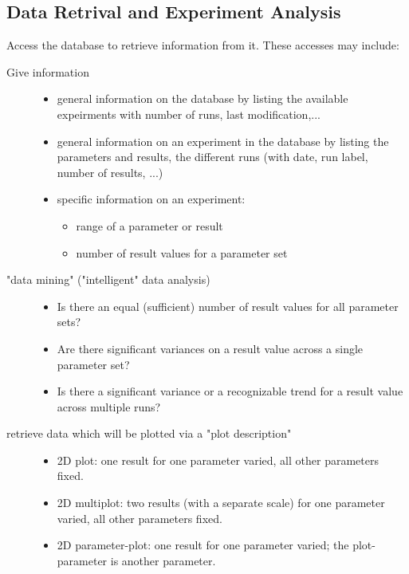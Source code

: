 \documentclass[12pt,a4paper]{article}
\begin{document}
\subsection{Data Retrival and Experiment Analysis}
\label{sec:exp-ana}
Access the database to retrieve information from it. These accesses may
include:
\begin{description}
   \item[Give information]
   \begin{itemize}
     \item general information on the database by listing the available expeirments 
       with number of runs, last modification,...
     \item general information on an experiment in the database by listing the 
       parameters and results, the different runs (with date, run label, 
       number of results, ...)
     \item specific information on an experiment:
      \begin{itemize}
       \item range of a parameter or result
       \item number of result values for a parameter set
      \end{itemize}
   \end{itemize}
   \item["data mining" ("intelligent" data analysis)]
   \begin{itemize}
       \item Is there an equal (sufficient) number of result values for all
         parameter sets?
       \item Are there significant variances on a result value across a single
         parameter set?
       \item Is there a significant variance or a recognizable trend for a result 
         value across multiple runs?
   \end{itemize}
   \item[retrieve data which will be plotted via a "plot description"]
   \begin{itemize}
     \item 2D plot: one result for one parameter varied, all other parameters 
       fixed. 
     \item 2D multiplot: two results (with a separate scale) for one parameter 
       varied, all other parameters fixed. 
     \item 2D parameter-plot: one result for one parameter varied; the plot-
       parameter is another parameter.

\end{itemize}
\end{description}
\end{document}
